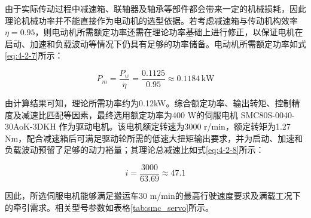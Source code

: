 {{{        由于实际传动过程中减速箱、联轴器及轴承等部件都会带来一定的机械损耗，因此理论机械功率并不能直接作为电动机的选型依据。若考虑减速箱与传动机构效率$\eta=0.95$，则电动机所需额定功率还需在理论功率基础上进行修正，以保证电机在启动、加速和负载波动等情况下仍具有足够的功率储备。电动机所需额定功率如式\eqref{eq:4-2-7}所示：

        \begin{equation}
        P_m = \frac{P_w}{\eta} = \frac{0.1125}{0.95} \approx 0.1184\,\mathrm{kW}
        \label{eq:4-2-7}
        \end{equation}

        由计算结果可知，理论所需功率约为0.12kW。综合额定功率、输出转矩、控制精度及减速比匹配等因素，最终选用额定功率为400 W的伺服电机 SMC80S-0040-30AoK-3DKH 作为驱动电机。该电机额定转速为3000 r/min，额定转矩为1.27 N\cdot m，配合减速箱后可满足驱动轮所需的低速大扭矩输出要求，并为启动、加速和负载波动预留了足够的动力裕量；其理论总减速比如式\eqref{eq:4-2-8}所示：

        \begin{equation}
        i = \frac{3000}{63.69} \approx 47.1
        \label{eq:4-2-8}
        \end{equation}

        因此，所选伺服电机能够满足搬运车30 m/min的最高行驶速度要求及满载工况下的牵引需求。相关型号参数如表格\ref{tab:smc_servo}所示。

}}}
